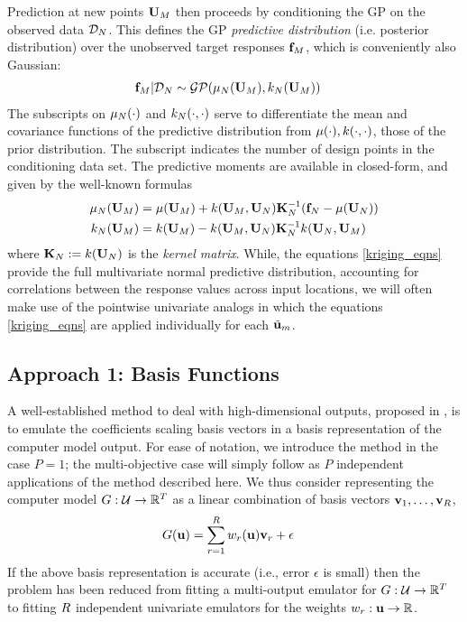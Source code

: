 \documentclass[12pt]{article}
\begin{document}
Prediction at new points $\designMat[M]$ then proceeds by conditioning the GP on the observed data $\designData_{\Ndesign}$. This defines the 
GP \textit{predictive distribution} (i.e. posterior distribution) over the unobserved target responses $\fObs[M]$, which is conveniently also Gaussian:
\begin{align}
\fObs[M] | \designData_{\Ndesign} &\sim \GP(\GPMeanPred[\Ndesign](\designMat[M]), \GPKerPred[\Ndesign](\designMat[M]))
\end{align}
The subscripts on $\GPMeanPred[\Ndesign](\cdot)$ and $\GPKerPred[\Ndesign](\cdot, \cdot)$ serve to differentiate the mean and covariance functions of the predictive 
distribution from $\GPMean(\cdot), \GPKer(\cdot, \cdot)$, those of the prior distribution. The subscript indicates the number of design points in the conditioning data set. 
The predictive moments are available in closed-form, and given by the well-known formulas 
\begin{align}
\GPMeanPred[\Ndesign](\designMat[M]) &= \GPMean(\designMat[M]) + \GPKer(\designMat[M], \designMat[\Ndesign]) \KerMat[\Ndesign]^{-1}(\fObs[\Ndesign] - \GPMean(\designMat[\Ndesign])) \label{kriging_eqns} \\
\GPKerPred[\Ndesign](\designMat[M]) &= \GPKer(\designMat[M]) - \GPKer(\designMat[M], \designMat[\Ndesign]) \KerMat[\Ndesign]^{-1} \GPKer(\designMat[\Ndesign], \designMat[M]) 
\end{align}
where $\KerMat[\Ndesign] := \GPKer(\designMat[\Ndesign])$ is the \textit{kernel matrix}. While, the equations \ref{kriging_eqns} provide the full multivariate normal predictive distribution, accounting for correlations between the response values across input locations, we will often make use of the pointwise univariate analogs in which the equations 
\ref{kriging_eqns} are applied individually for each $\tilde{\bpar}_m$. 

\subsection{Approach 1: Basis Functions}
A well-established method to deal with high-dimensional outputs, proposed in \cite{Higdon}, is to emulate the coefficients scaling basis vectors in a basis 
representation of the computer model output. For ease of notation, we introduce the method in the case $P = 1$; the multi-objective case will simply follow 
as $P$ independent applications of the method described here. We thus consider representing the computer model $\fwd: \parSpace \to \R^{\Ntime}$ as a linear 
combination of basis vectors $\basisOutputVec_1, \dots, \basisOutputVec_{\NbasisVec}$,
\begin{align}
\fwd(\bpar) &= \sum_{\basisVecIdx = 1}^{\NbasisVec} \basisVecWeight_{\basisVecIdx}(\bpar) \basisOutputVec _{\basisVecIdx} + \epsilon \label{basis_representation}
\end{align}
If the above basis representation is accurate (i.e., error $\epsilon$ is small) then the problem has been reduced from fitting a multi-output emulator for
$\fwd: \parSpace \to \R^{\Ntime}$ to fitting $\NbasisVec$ independent univariate emulators for the weights $\basisVecWeight_{\basisVecIdx}: \bpar \to \R$. 
\end{document}

